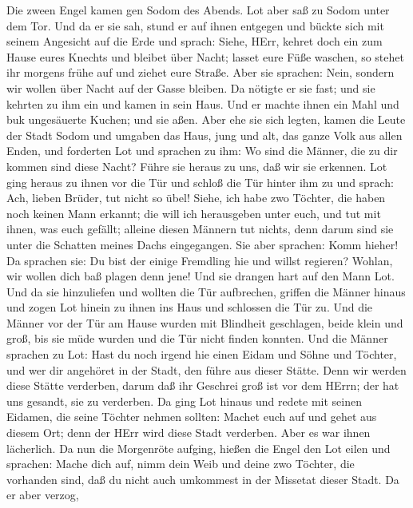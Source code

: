  Die zween Engel kamen gen Sodom des Abends. Lot aber saß zu
Sodom unter dem Tor. Und da er sie sah, stund er auf ihnen entgegen und
bückte sich mit seinem Angesicht auf die Erde  und sprach:
Siehe, HErr, kehret doch ein zum Hause eures Knechts und bleibet über
Nacht; lasset eure Füße waschen, so stehet ihr morgens frühe auf und
ziehet eure Straße. Aber sie sprachen: Nein, sondern wir wollen über
Nacht auf der Gasse bleiben.  Da nötigte er sie fast; und
sie kehrten zu ihm ein und kamen in sein Haus. Und er machte ihnen ein
Mahl und buk ungesäuerte Kuchen; und sie aßen.  Aber ehe sie
sich legten, kamen die Leute der Stadt Sodom und umgaben das Haus, jung
und alt, das ganze Volk aus allen Enden,  und forderten Lot
und sprachen zu ihm: Wo sind die Männer, die zu dir kommen sind diese
Nacht? Führe sie heraus zu uns, daß wir sie erkennen.  Lot
ging heraus zu ihnen vor die Tür und schloß die Tür hinter ihm zu
 und sprach: Ach, lieben Brüder, tut nicht so übel!
 Siehe, ich habe zwo Töchter, die haben noch keinen Mann
erkannt; die will ich herausgeben unter euch, und tut mit ihnen, was
euch gefällt; alleine diesen Männern tut nichts, denn darum sind sie
unter die Schatten meines Dachs eingegangen.  Sie aber
sprachen: Komm hieher! Da sprachen sie: Du bist der einige Fremdling hie
und willst regieren? Wohlan, wir wollen dich baß plagen denn jene! Und
sie drangen hart auf den Mann Lot. Und da sie hinzuliefen und wollten
die Tür aufbrechen,  griffen die Männer hinaus und zogen
Lot hinein zu ihnen ins Haus und schlossen die Tür zu.  Und
die Männer vor der Tür am Hause wurden mit Blindheit geschlagen, beide
klein und groß, bis sie müde wurden und die Tür nicht finden konnten.
 Und die Männer sprachen zu Lot: Hast du noch irgend hie
einen Eidam und Söhne und Töchter, und wer dir angehöret in der Stadt,
den führe aus dieser Stätte.  Denn wir werden diese Stätte
verderben, darum daß ihr Geschrei groß ist vor dem HErrn; der hat uns
gesandt, sie zu verderben.  Da ging Lot hinaus und redete
mit seinen Eidamen, die seine Töchter nehmen sollten: Machet euch auf
und gehet aus diesem Ort; denn der HErr wird diese Stadt verderben. Aber
es war ihnen lächerlich.  Da nun die Morgenröte aufging,
hießen die Engel den Lot eilen und sprachen: Mache dich auf, nimm dein
Weib und deine zwo Töchter, die vorhanden sind, daß du nicht auch
umkommest in der Missetat dieser Stadt.  Da er aber verzog,
